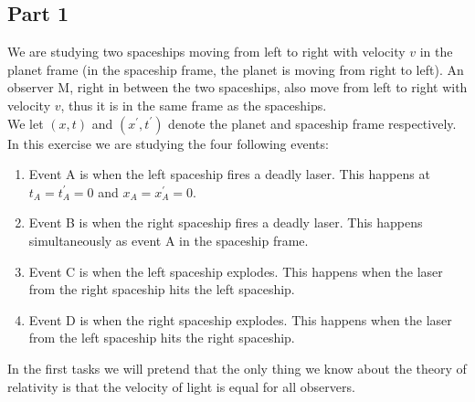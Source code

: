 \documentclass[a4paper,10pt,english]{article}
\begin{document}
\subsection*{Part 1}

We are studying two spaceships moving from left to right with velocity $v$ in the planet frame (in the spaceship frame, the planet is moving from right to left). An observer M, right in between the two spaceships, also move from left to right with velocity $v$, thus it is in the same frame as the spaceships.
\\
We let $(x,t)$ and $(x^{\prime},t^{\prime})$ denote the planet and spaceship frame respectively. In this exercise we are studying the four following events:
\begin{enumerate} %
\item Event A is when the left spaceship fires a deadly laser. This happens at $t_{A}=t_{A}^{\prime}=0$ and $x_{A}=x_{A}^{\prime}=0$.
\item Event B is when the right spaceship fires a deadly laser. This happens simultaneously as event A in the spaceship frame.
\item Event C is when the left spaceship explodes. This happens when the laser from the right spaceship hits the left spaceship.
\item Event D is when the right spaceship explodes. This happens when the laser from the left spaceship hits the right spaceship.
\end{enumerate} %

In the first tasks we will pretend that the only thing we know about the theory of relativity is that the velocity of light is equal for all observers.
\end{document}
